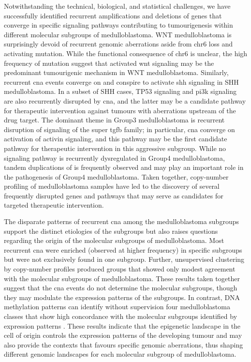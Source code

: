 Notwithstanding the technical, biological, and statistical challenges, we have successfully identified recurrent amplifications and deletions of genes that converge in specific signaling pathways contributing to tumourigenesis within different molecular subgroups of medulloblastoma. WNT medulloblastoma is surprisingly devoid of recurrent genomic aberrations aside from chr6 loss and  activating mutation. While the functional consequence of chr6 is unclear, the high frequency of  mutation suggest that activated \gls{wnt} signaling may be the predominant tumourigenic mechanism in WNT medulloblastoma. Similarly, recurrent \gls{cna} events converge on and conspire to activate \gls{shh} signaling in SHH medulloblastoma. In a subset of SHH cases, TP53 signaling and \gls{pi3k} signaling are also recurrently disrupted by \gls{cna}, and the latter may be a candidate pathway for therapeutic intervention against tumours with aberrations upstream of the drug target. The dominant theme in Group3 medulloblastoma is recurrent disruption of signaling of the super \gls{tgfb} family; in particular, \gls{cna} converge on activation of activin signaling, and this pathway may be the first candidate pathway for therapeutic intervention in this aggressive subgroup. While no signaling pathway is recurrently dysregulated in Group4 medulloblastoma, tandem duplications of  is frequently observed and may play an important role in the pathogenesis of Group4 medulloblastoma. Taken together, copy-number profiling of medulloblastoma samples have led to the discovery of several frequently disrupted genes and pathways that may serve as candidates for targeted therapeutic intervention.

The disparate patterns of recurrent \gls{cna} among the medulloblastoma subgroups support the distinct etiologies of the subgroups but also raises questions regarding the origin of the molecular subgroups of medulloblastoma. Most recurrent \gls{cna} were enriched (observed at higher frequency) in specific subgroups but were not exclusively found in one subgroup. Further, unsupervised clustering by copy-number profiles produced groups that showed only modest agreement with the molecular subgroups of medulloblastoma. These results taken together suggest that the \gls{cna} events do not determine the molecular subgroups, though they may modulate the expression patterns of the subgroups. In contrast, DNA methylation patterns can identify without supervision four medulloblastoma classes that show high concordance with the molecular subgroups identified by expression patterns . These results indicate that the epigenetic landscape in the cell of origin controls the expression patterns of the developing tumour and may also provide the contexts that favours specific genomic aberrations, thus shaping different genomic landscapes for each molecular subgroup of medulloblastoma.

